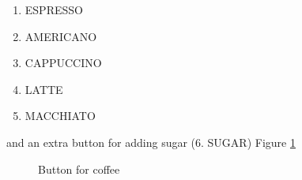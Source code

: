 \documentclass[12pt]{article}
\begin{document}
\begin{enumerate}

	\item ESPRESSO
	\item AMERICANO
	\item CAPPUCCINO
	\item LATTE
	\item MACCHIATO


\end{enumerate}

and an extra button for adding sugar (6. SUGAR) Figure \ref{fig:eagle2}

\begin{figure}[H]
\caption{Button for coffee}
\label{fig:eagle2}
\end{figure}
\end{document}
